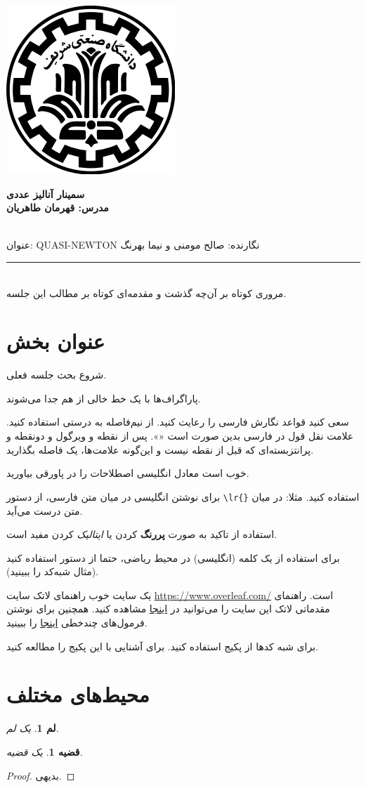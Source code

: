 \documentclass[11pt]{article}
\date{\today}
\newcommand{\lecture}[3]{
	{
		\begin{center}
			\vspace{-1cm}
			\includegraphics[scale=0.15]{Sharif}%
		\end{center}
		\vspace{-8mm}
		\begin{center}
			
			\bf
			{
				\Large
سمینار آنالیز عددی 
			}
			\\
مدرس: قهرمان طاهریان
			\\~
		\date{\today}
		\end{center}
	}\vspace*{-1em}
	\noindent
 #1: #2 \hfill نگارنده: #3
	\vspace{-4mm}
	\rule{\textwidth}{1pt}
	\ \\
}
\newtheorem{theorem}{قضیه}
\newtheorem{lemma}{لم}
\begin{document}
	\lecture{عنوان}{QUASI-NEWTON}{صالح مومنی و نیما بهرنگ}
	مروری کوتاه بر آن‌چه گذشت و مقدمه‌ای کوتاه بر مطالب این جلسه. 
	
	\section{عنوان بخش}
	شروع بحث جلسه فعلی. 
	
	پاراگراف‌ها با یک خط خالی از هم جدا می‌شوند. 
	
	سعی کنید قواعد نگارش فارسی را رعایت کنید. از نیم‌فاصله
	به درستی استفاده کنید. علامت نقل قول در فارسی بدین صورت است «». پس از نقطه و ویرگول و دونقطه و پرانتزبسته‌ای که قبل از نقطه نیست و این‌گونه علامت‌ها، یک فاصله بگذارید.
	
	خوب است معادل انگلیسی اصطلاحات را در پاورقی%
	بیاورید.
	
	برای نوشتن انگلیسی در میان متن فارسی، از دستور \verb+\lr{}+ استفاده کنید. 
	مثلا:
	در میان متن درست می‌آید.
	
	استفاده از تاکید به صورت 
	\textbf{پررنگ}
	کردن یا 
	\textit{ایتالیک}
	کردن مفید است. 
	
	برای استفاده از یک کلمه (انگلیسی) در محیط ریاضی، حتما از دستور
	استفاده کنید (مثال شبه‌کد را ببینید). 
	
	یک سایت خوب راهنمای لاتک سایت 
	\url{https://www.overleaf.com/}
	است. 
	راهنمای مقدماتی لاتک این سایت را می‌توانید در 
	\href{https://www.overleaf.com/learn/latex/Learn_LaTeX_in_30_minutes}{اینجا}
	مشاهده کنید. 
	همچنین برای نوشتن فرمول‌های چندخطی  
	\href{https://www.overleaf.com/learn/latex/Aligning_equations_with_amsmath}{اینجا}
	را ببینید. 
	
	برای شبه کدها از پکیج
	استفاده کنید. برای آشنایی با این پکیج
	را مطالعه کنید.
		\begin{latin}
		\begin{codebox}

		\end{codebox}
	\end{latin}
	
	
	
	\section{محیط‌های مختلف}
	\begin{lemma}
		یک لم.
	\end{lemma}
	\begin{theorem}
		\label{thm:sample}
		یک قضیه. 
	\end{theorem}
	\begin{proof}
		بدیهی.
	\end{proof}
	
\end{document}
